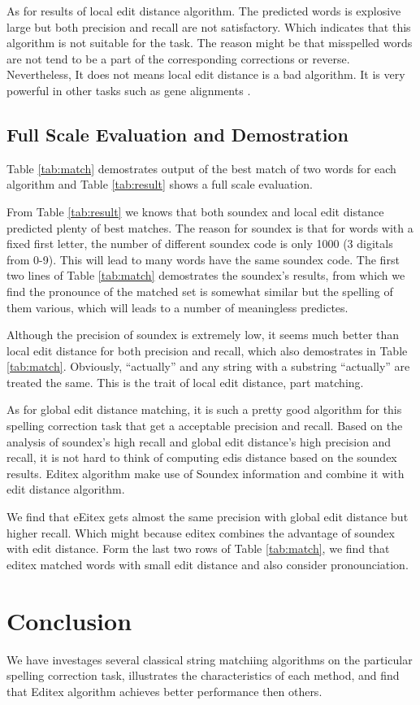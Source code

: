 \documentclass[11pt]{article}
\begin{document}
As for results of local edit distance algorithm. The predicted words is explosive large but both precision and recall are not satisfactory. Which indicates that this algorithm is not suitable for the task. The reason might be that misspelled words are not tend to be a part of the corresponding corrections or reverse. Nevertheless, It does not means local edit distance is a bad algorithm. It is very powerful in other tasks such as gene alignments \cite{Altschul1986Locally}.


\subsection{Full Scale Evaluation and Demostration}

Table \ref{tab:match} demostrates output of the best match of two words for each algorithm and Table \ref{tab:result} shows a full scale evaluation.

From Table \ref{tab:result} we knows that both soundex and local edit distance predicted plenty of best matches. The reason for soundex is that for words with a fixed first letter, the number of different soundex code is only 1000 (3 digitals from 0-9). This will lead to many words have the same soundex code. The first two lines of Table \ref{tab:match} demostrates the soundex's results, from which we find the pronounce of the matched set is somewhat similar but the spelling of them various, which will leads to a number of meaningless predictes.

Although the precision of soundex is extremely low,  it seems much better than local edit distance for both precision and recall, which also demostrates in Table \ref{tab:match}.  Obviously, ``actually'' and any string with a substring  ``actually'' are treated the same. This is the trait of local edit distance, part matching.

As for global edit distance matching, it is such a pretty good algorithm for this spelling correction task that get a acceptable precision and recall. Based on the analysis of soundex's high recall and global edit distance's high precision and recall, it is not hard to think of computing edis distance based on the soundex results. Editex algorithm make use of Soundex information and combine it with edit distance algorithm. 

We find that eEitex gets almost the same precision with global edit distance but higher recall. Which might because editex combines the advantage of soundex with edit distance. Form the last two rows of Table \ref{tab:match}, we find that editex matched words with small edit distance and also consider pronounciation.


\section{Conclusion}

We have investages several classical string matchiing algorithms on the particular spelling correction task, illustrates the characteristics of each method, and find that Editex algorithm achieves better performance then others.



\end{document}
